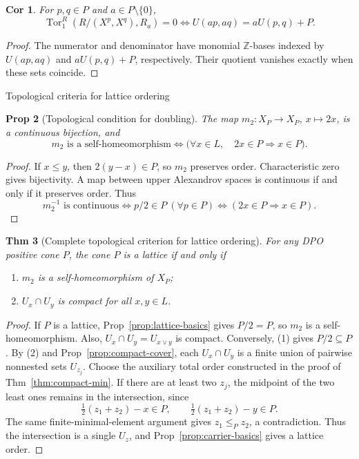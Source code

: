 \documentclass[10pt,letterpaper]{amsart}
\makeatletter
\numberwithin{equation}{section}
\newtheorem{thm}{Thm}[section]
\newtheorem{prop}[thm]{Prop}
\newtheorem{cor}[thm]{Cor}
\theoremstyle{definition}
\newcommand{\Z}{\mathbb Z}
\newcommand{\Tor}{\operatorname{Tor}}
\def\subsection{\@startsection{subsection}{2}
  \z@{.9\linespacing\@plus.3\linespacing}{.4\linespacing}
  {\normalfont\fontsize{11.5}{14}\selectfont\bfseries\boldmath\raggedright}}
\makeatother
\begin{document}
\begin{cor}\label{cor:upper-defect}
For $p,q\in P$ and $a\in P\setminus\{0\}$,
\[
\Tor_1^R(R/(X^p,X^q),R_a)=0
\iff U(ap,aq)=aU(p,q)+P.
\]
\end{cor}
\begin{proof}
The numerator and denominator have monomial $\Z$-bases indexed by $U(ap,aq)$ and $aU(p,q)+P$, respectively. Their quotient vanishes exactly when these sets coincide.
\end{proof}

\subsection{Topological criteria for lattice ordering}
\begin{prop}[Topological condition for doubling]\label{prop:double}
The map $m_2:X_P\to X_P$, $x\mapsto2x$, is a continuous bijection, and
\[
m_2\text{ is a self-homeomorphism}
\iff \bigl(\forall x\in L,\quad 2x\in P\Longrightarrow x\in P\bigr).
\]
\end{prop}
\begin{proof}
If $x\le y$, then $2(y-x)\in P$, so $m_2$ preserves order. Characteristic zero gives bijectivity.
A map between upper Alexandrov spaces is continuous if and only if it preserves order. Thus
\[
m_2^{-1}\text{ is continuous}\iff p/2\in P\ (\forall p\in P)
\iff(2x\in P\Rightarrow x\in P).
\]
\end{proof}

\begin{thm}[Complete topological criterion for lattice ordering]\label{thm:general-compact}
For any DPO positive cone $P$, the cone $P$ is a lattice if and only if
\begin{enumerate}
\item $m_2$ is a self-homeomorphism of $X_P$;
\item $U_x\cap U_y$ is compact for all $x,y\in L$.
\end{enumerate}
\end{thm}
\begin{proof}
If $P$ is a lattice, Prop~\ref{prop:lattice-basics} gives $P/2=P$, so $m_2$ is a self-homeomorphism. Also, $U_x\cap U_y=U_{x\vee y}$ is compact.
Conversely, (1) gives $P/2\subseteq P$. By (2) and Prop~\ref{prop:compact-cover}, each $U_x\cap U_y$ is a finite union of pairwise nonnested sets $U_{z_j}$. Choose the auxiliary total order constructed in the proof of Thm~\ref{thm:compact-min}. If there are at least two $z_j$, the midpoint of the two least ones remains in the intersection, since
\[
\tfrac12(z_1+z_2)-x\in P,\qquad\tfrac12(z_1+z_2)-y\in P.
\]
The same finite-minimal-element argument gives $z_1\le_Pz_2$, a contradiction. Thus the intersection is a single $U_z$, and Prop~\ref{prop:carrier-basics} gives a lattice order.
\end{proof}
\end{document}
